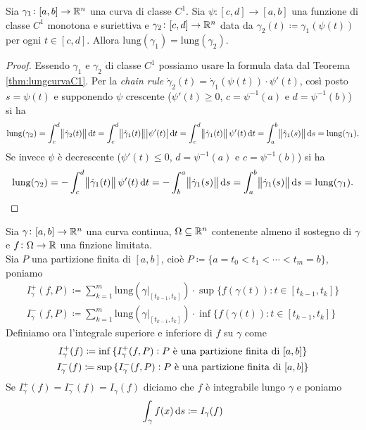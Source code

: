 \begin{thm}[riparametrizzazione $ C^1 $]
	Sia $ \gamma_1 \colon [a, b] \to \mathbb{R}^n $ una curva di classe $ C^1 $. Sia $ \psi \colon [c, d] \to [a, b] $ una funzione di classe $ C^1 $ monotona e suriettiva e $ \gamma_2 \colon [c, d] \to \mathbb{R}^n $ data da $ \gamma_2(t) \coloneqq \gamma_1(\psi(t)) $ per ogni $ t \in [c, d] $. Allora $ \mathrm{lung}(\gamma_1) = \mathrm{lung}(\gamma_2) $.
\end{thm}
%
\begin{proof}
	Essendo $ \gamma_1 $ e $ \gamma_2 $ di classe $ C^1 $ possiamo usare la formula data dal Teorema \ref{thm:lungcurvaC1}. Per la \emph{chain rule} $ \dot{\gamma}_2(t) = \dot{\gamma}_1(\psi(t)) \cdot \psi'(t) $, così posto $ s = \psi(t) $ e supponendo $ \psi $ crescente ($ \psi'(t) \geq 0 $, $ c = \psi^{-1}(a) $ e $ d = \psi^{-1}(b) $) si ha
	\[
		\mathrm{lung}(\gamma_2) = \int_{c}^{d} \norm{\dot{\gamma}_2(t)} \dif{t} = \int_{c}^{d} \norm{\dot{\gamma}_1(t)} \abs{\psi'(t)} \dif{t} = \int_{c}^{d} \norm{\dot{\gamma}_1(t)} \psi'(t) \dif{t} = \int_{a}^{b} \norm{\dot{\gamma}_1(s)} \dif{s} = \mathrm{lung}(\gamma_1).
	\]
	Se invece $ \psi $ è decrescente ($ \psi'(t) \leq 0 $, $ d = \psi^{-1}(a) $ e $ c = \psi^{-1}(b) $) si ha
	\[
		\mathrm{lung}(\gamma_2) = - \int_{c}^{d} \norm{\dot{\gamma}_1(t)} \psi'(t) \dif{t} = - \int_{b}^{a} \norm{\dot{\gamma}_1(s)} \dif{s} = \int_{a}^{b} \norm{\dot{\gamma}_1(s)} \dif{s} = \mathrm{lung}(\gamma_1). \qedhere
	\]
\end{proof}


\begin{definition}
	Sia $ \gamma \colon [a, b] \to \mathbb{R}^n $ una curva continua, $ \Omega \subseteq \mathbb{R}^n $ contenente almeno il sostegno di $ \gamma $ e $ f \colon \Omega \to \mathbb{R} $ una finzione limitata. \\
	Sia $ P $ una partizione finita di $ [a, b] $, cioè $ P \coloneqq \{a = t_0 < t_1 < \cdots < t_m = b\} $, poniamo
	\begin{gather*}
		I^+_{\gamma}(f, P) \coloneqq \sum_{k = 1}^{m} \mathrm{lung}\left(\gamma \lvert_{[t_{k - 1}, t_k]}\right) \cdot \sup{\{f(\gamma(t)) : t \in [t_{k - 1}, t_k]\}} \\
		I^-_{\gamma}(f, P) \coloneqq \sum_{k = 1}^{m} \mathrm{lung}\left(\gamma \lvert_{[t_{k - 1}, t_k]}\right) \cdot \inf{\{f(\gamma(t)) : t \in [t_{k - 1}, t_k]\}}
	\end{gather*}
	Definiamo ora l'integrale superiore e inferiore di $ f $ su $ \gamma $ come
	\begin{gather*}
		I^+_{\gamma}(f) \coloneqq \inf{\{I^+_{\gamma}(f, P) : \text{$ P $ è una partizione finita di $ [a, b] $}\}} \\
		I^-_{\gamma}(f) \coloneqq \sup{\{I^-_{\gamma}(f, P) : \text{$ P $ è una partizione finita di $ [a, b] $}\}}
	\end{gather*}
	Se $ I^+_{\gamma}(f) = I^-_{\gamma}(f) = I_{\gamma}(f) $ diciamo che $ f $ è integrabile lungo $ \gamma $ e poniamo
	\begin{equation}
		\int_{\gamma} f(x) \dif{s} \coloneqq I_{\gamma}(f)
	\end{equation}
\end{definition}

